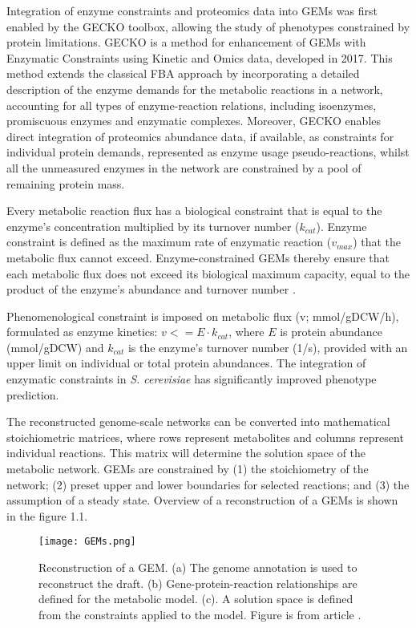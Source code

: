 Integration of enzyme constraints and proteomics data into GEMs was first enabled by the GECKO toolbox, allowing the study of phenotypes constrained by 
protein limitations. GECKO is a method for enhancement of GEMs with Enzymatic Constraints using 
Kinetic and Omics data, developed in 2017. This method extends the classical FBA 
approach by incorporating a detailed description of the enzyme demands for the metabolic reactions in a network, accounting for all types of enzyme-reaction 
relations, including isoenzymes, promiscuous enzymes and enzymatic complexes. Moreover, GECKO enables direct integration of proteomics abundance data, 
if available, as constraints for individual protein demands, represented as enzyme usage pseudo-reactions, whilst all the unmeasured enzymes in the network 
are constrained by a pool of remaining protein mass. \cite{Domenzain2022}

Every metabolic reaction flux has a
biological constraint that is equal to the enzyme's concentration multiplied by its turnover number ($k_{cat}$). Enzyme constraint is
defined as the maximum rate of enzymatic reaction ($v_{max}$) that the metabolic flux cannot exceed. Enzyme-constrained GEMs thereby 
ensure that each metabolic flux does not exceed its biological maximum capacity, 
equal to the product of the enzyme's abundance and turnover number \cite{Sanchez2017}.

Phenomenological constraint is imposed on metabolic flux (v; mmol/gDCW/h), formulated as enzyme
kinetics: $v <=  E \cdot k_{cat}$, where $E$ is protein abundance (mmol/gDCW) and $k_{cat}$ is the enzyme's turnover number (1/s),
provided with an upper limit on individual or total protein abundances. The integration of
enzymatic constraints in \textit{S. cerevisiae} has significantly improved phenotype prediction. \cite{Sanchez2017}

The reconstructed genome-scale networks can be converted into mathematical stoichiometric matrices, where rows represent metabolites 
and columns represent individual reactions. This matrix will
determine the solution space of the metabolic network. GEMs are constrained by (1) the stoichiometry of the
network; (2) preset upper and lower boundaries for selected reactions; and (3) the assumption of a steady state. \cite{Kerkhoven2014} 
Overview of a reconstruction of a GEMs is shown in the figure 1.1.


\begin{figure}[h]
    \texttt{[image: GEMs.png]}
    \caption{Reconstruction of a GEM. (a) The genome annotation is used 
    to reconstruct the draft. (b) Gene-protein-reaction relationships are defined for the metabolic model. 
     (c). A solution space is defined from the constraints applied to the model. Figure is from article \cite{Kerkhoven2014}.}
    \label{GEMs}
\end{figure}





